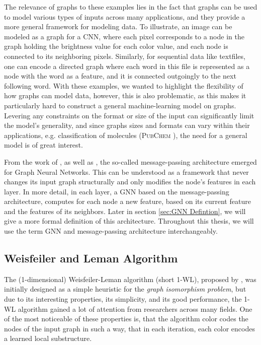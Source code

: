 \documentclass[11pt, dvipsnames, DIV=12]{scrreprt}
\theoremstyle{definition}
\begin{document}
The relevance of graphs to these examples lies in the fact that graphs can be used to model various types of inputs across many applications, and they provide a more general framework for modeling data. To illustrate, an image can be modeled as a graph for a CNN, where each pixel corresponds to a node in the graph holding the brightness value for each color value, and each node is connected to its neighboring pixels. Similarly, for sequential data like textfiles, one can encode a directed graph where each word in this file is represented as a node with the word as a feature, and it is connected outgoingly to the next following word. With these examples, we wanted to highlight the flexibility of how graphs can model data, however, this is also problematic, as this makes it particularly hard to construct a general machine-learning model on graphs. Levering any constraints on the format or size of the input can significantly limit the model's generality, and since graphs sizes and formats can vary within their applications, e.g. classification of molecules (\textsc{PubChem} \cite{Mor+2020}), the need for a general model is of great interest.

From the work of \cite{Gil+2017}, as well as \cite{Sca+2009}, the so-called message-passing architecture emerged for Graph Neural Networks. This can be understood as a framework that never changes its input graph structurally and only modifies the node's features in each layer. In more detail, in each layer, a GNN based on the message-passing architecture, computes for each node a new feature, based on its current feature and the features of its neighbors. Later in section \ref{sec:GNN Defintion}, we will give a more formal definition of this architecture.
Throughout this thesis, we will use the term GNN and message-passing architecture interchangeably.


\subsection{Weisfeiler and Leman Algorithm}
The (1-dimensional) Weisfeiler-Leman algorithm (short 1-WL), proposed by \cite{Wei+1968}, was initially designed as a simple heuristic for the \textit{graph isomorphism problem}, but due to its interesting properties, its simplicity, and its good performance, the 1-WL algorithm gained a lot of attention from researchers across many fields. One of the most noticeable of these properties is, that the algorithm color codes the nodes of the input graph in such a way, that in each iteration, each color encodes a learned local substructure.
\end{document}
